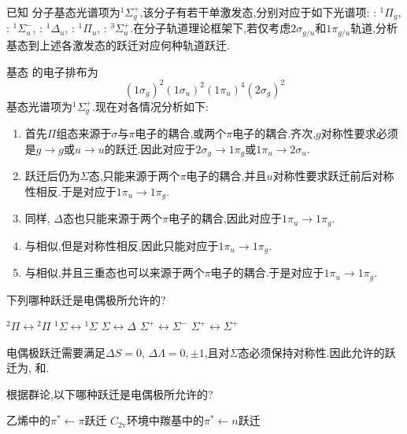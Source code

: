 \documentclass{ctexart}
\begin{document}
\begin{homework}[11.]
    已知 分子基态光谱项为$^1\Sigma_g^+$,该分子有若干单激发态,分别对应于如下光谱项: : $^1\Pi_g$, : $^1\Sigma_u^-$, : $^1\Delta_u$, : $^1\Pi_u$, : $^3\Sigma_u^+$.在分子轨道理论框架下,若仅考虑$2\sigma_{g/u}$和$1\pi_{g/u}$轨道,分析基态到上述各激发态的跃迁对应何种轨道跃迁.
\end{homework}
\begin{solution}
    基态 的电子排布为
    \[(1\sigma_g)^2(1\sigma_u)^2(1\pi_u)^4(2\sigma_g)^2\]
    基态光谱项为$^1\Sigma_g^+$.现在对各情况分析如下:
    \begin{enumerate}[label=\tbf{(\alph*)}]
        \item 首先$\Pi$组态来源于$\sigma$与$\pi$电子的耦合,或两个$\pi$电子的耦合.齐次,$g$对称性要求必须是$g\to g$或$u\to u$的跃迁.因此对应于$2\sigma_g\to1\pi_g$或$1\pi_u\to2\sigma_u$.
        \item 跃迁后仍为$\Sigma$态,只能来源于两个$\pi$电子的耦合,并且$u$对称性要求跃迁前后对称性相反.于是对应于$1\pi_u\to1\pi_g$.
        \item 同样, $\Delta$态也只能来源于两个$\pi$电子的耦合,因此对应于$1\pi_u\to1\pi_g$.
        \item 与相似,但是对称性相反,因此只能对应于$1\pi_u\to1\pi_g$.
        \item 与相似,并且三重态也可以来源于两个$\pi$电子的耦合.于是对应于$1\pi_u\to1\pi_g$.
    \end{enumerate}
\end{solution}
\begin{homework}[12.]
    下列哪种跃迁是电偶极所允许的?
    \begin{center}
         $^2\Pi\leftrightarrow{^2\Pi}$\qquad{} $^1\Sigma\leftrightarrow{^1\Sigma} $\qquad{} $\Sigma\leftrightarrow\Delta$\qquad{} $\Sigma^+\leftrightarrow\Sigma^{-}$\qquad{} $\Sigma^+\leftrightarrow\Sigma^{+}$
    \end{center}
\end{homework}
\begin{solution}
    电偶极跃迁需要满足$\Delta S=0$, $\Delta\Lambda=0,\pm1$,且对$\Sigma$态必须保持对称性.因此允许的跃迁为, 和.
\end{solution}
\begin{homework}[13.]
    根据群论,以下哪种跃迁是电偶极所允许的?
    \begin{center}
         乙烯中的$\pi^\ast\leftarrow\pi$跃迁\qquad{} $C_{2\text{v}}$环境中羰基中的$\pi^\ast\leftarrow n$跃迁
    \end{center}
\end{homework}
\end{document}
